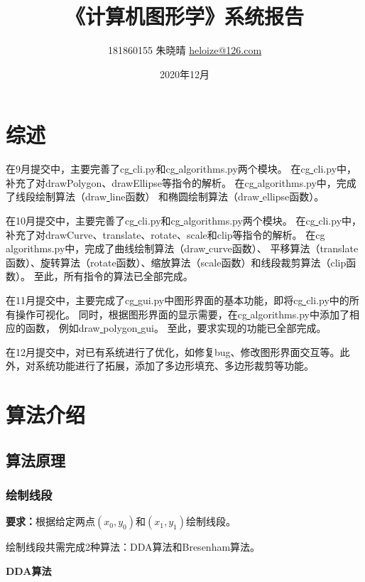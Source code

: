 \documentclass[a4paper,UTF8]{article}
\begin{document}
\title{《计算机图形学》系统报告}
\author{181860155 朱晓晴 \href{mailto:heloize@126.com}{heloize@126.com}}
\date{2020年12月}
\maketitle

\section{综述}
在9月提交中，主要完善了cg\underline{ }cli.py和cg\underline{ }algorithms.py两个模块。
在cg\underline{ }cli.py中，补充了对drawPolygon、drawEllipse等指令的解析。
在cg\underline{ }algorithms.py中，完成了线段绘制算法（draw\underline{ }line函数）
和椭圆绘制算法（draw\underline{ }ellipse函数）。

在10月提交中，主要完善了cg\underline{ }cli.py和cg\underline{ }algorithms.py两个模块。
在cg\underline{ }cli.py中，补充了对drawCurve、translate、rotate、scale和clip等指令的解析。
在cg\underline{ }algorithms.py中，完成了曲线绘制算法（draw\underline{ }curve函数）、
平移算法（translate函数）、旋转算法（rotate函数）、缩放算法（scale函数）和线段裁剪算法（clip函数）。
至此，所有指令的算法已全部完成。

在11月提交中，主要完成了cg\underline{ }gui.py中图形界面的基本功能，即将cg\underline{ }cli.py中的所有操作可视化。
同时，根据图形界面的显示需要，在cg\underline{ }algorithms.py中添加了相应的函数，
例如draw\underline{ }polygon\underline{ }gui。
至此，要求实现的功能已全部完成。

在12月提交中，对已有系统进行了优化，如修复bug、修改图形界面交互等。此外，对系统功能进行了拓展，添加了多边形填充、多边形裁剪等功能。


\section{算法介绍}
\subsection{算法原理}
\subsubsection{绘制线段}
\textbf{要求：}根据给定两点$(x_0,y_0)$和$(x_1,y_1)$绘制线段。

绘制线段共需完成2种算法：DDA算法和Bresenham算法。

\textbf{DDA算法}
\end{document}
